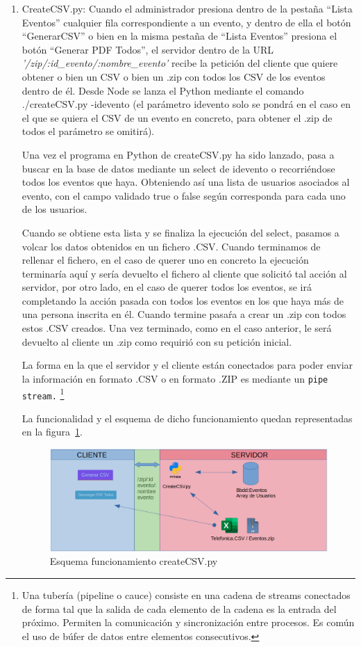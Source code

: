 \documentclass[a4paper, 12pt]{book}
\begin{document}
\begin{enumerate}
  	\item CreateCSV.py: Cuando el administrador presiona dentro de la pestaña ``Lista Eventos'' cualquier fila correspondiente a un evento, y dentro de ella el botón ``GenerarCSV'' o bien en la misma pestaña de ``Lista Eventos'' presiona el botón ``Generar PDF Todos'', el servidor dentro de la URL \textit{'/zip/:id\_evento/:nombre\_evento'} recibe la petición del cliente que quiere obtener o bien un CSV o bien un .zip con todos los CSV de los eventos dentro de él. Desde Node se lanza el Python mediante el comando ./createCSV.py -idevento (el parámetro idevento solo se pondrá en el caso en el que se quiera el CSV de un evento en concreto, para obtener el .zip de todos el parámetro se omitirá).
  	
  	Una vez el programa en Python de createCSV.py ha sido lanzado, pasa a buscar en la base de datos mediante un select de idevento o recorriéndose todos los eventos que haya. Obteniendo así una lista de usuarios asociados al evento, con el campo validado true o false según corresponda para cada uno de los usuarios.
  	
  	Cuando se obtiene esta lista y se finaliza la ejecución del select, pasamos a volcar los datos obtenidos en un fichero .CSV. Cuando terminamos de rellenar el fichero, en el caso de querer uno en concreto la ejecución terminaría aquí y sería devuelto el fichero al cliente que solicitó tal acción al servidor, por otro lado, en el caso de querer todos los eventos, se irá completando la acción pasada con todos los eventos en los que haya más de una persona inscrita en él. Cuando termine pasaŕa a crear un .zip con todos estos .CSV creados. Una vez terminado, como en el caso anterior, le será devuelto al cliente un .zip como requirió con su petición inicial.
  	
  	La forma en la que el servidor y el cliente están conectados para poder enviar la información en formato .CSV o en formato .ZIP es mediante un \texttt{pipe stream.} 
\footnote{Una tubería (pipeline o cauce) consiste en una cadena de streams conectados de forma tal que la salida de cada elemento de la cadena es la entrada del próximo. Permiten la comunicación y sincronización entre procesos. Es común el uso de búfer de datos entre elementos consecutivos.}
  	
  	La funcionalidad y el esquema de dicho funcionamiento quedan representadas en la figura~\ref{fig:createCSV}.

\begin{figure}[h!]
  \centering
  \includegraphics[width=16cm, keepaspectratio]{img/createCSV.png}
  	\caption{Esquema funcionamiento createCSV.py}\label{fig:createCSV}
\end{figure}  	
  	

\end{enumerate}
\end{document}
